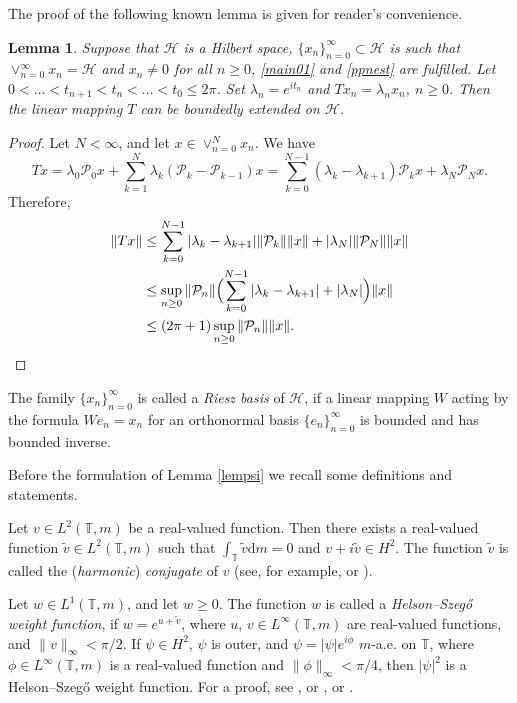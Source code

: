 \documentclass[a4paper,oneside,11pt]{amsart}
\numberwithin{equation}{section}
\theoremstyle{plain}
\newtheorem{lemma}[theorem]{Lemma}
\theoremstyle{definition}
\begin{document}
The proof of the following known lemma is given for reader's convenience. 

\begin{lemma} \label{lemttbounded} Suppose that $\mathcal H$ is a Hilbert space,  
$\{x_n\}_{n=0}^\infty\subset\mathcal H$ is such that $\vee_{n=0}^\infty x_n=\mathcal H$ and
 $x_n\neq 0$ for all $n\geq 0$, \eqref{main01} and   \eqref{ppnest} are fulfilled.  
Let $0<\ldots <t_{n+1}<t_n<\ldots<t_0\leq 2\pi$. Set $\lambda_n=e^{it_n}$ and $Tx_n=\lambda_n x_n$, $n\geq 0$. 
Then the linear mapping $T$ can be boundedly extended on $\mathcal H$. 
\end{lemma} 
\begin{proof}  Let $N<\infty$, and let $x\in\vee_{n=0}^N x_n$. 
We have  
$$Tx=\lambda_0\mathcal P_0 x + \sum_{k=1}^N \lambda_k(\mathcal P_k-\mathcal P_{k-1})x=
 \sum_{k=0}^{N-1}( \lambda_k-\lambda_{k+1})\mathcal P_k x +\lambda_N\mathcal P_N x.$$
Therefore, \begin{align*}\|Tx\|&\leq \sum_{k=0}^{N-1}|\lambda_k-\lambda_{k+1}|\|\mathcal P_k\|\| x \|+|\lambda_N|\|\mathcal P_N\|\| x\|\\&
\leq\sup_{n\geq 0}\|\mathcal P_n\|\Bigl(\sum_{k=0}^{N-1}|\lambda_k-\lambda_{k+1}|+|\lambda_N|\Bigr)\| x\|\\&\leq
(2\pi+1)\sup_{n\geq 0}\|\mathcal P_n\|\| x\|. \qedhere\end{align*}
\end{proof}

The family  $\{x_n\}_{n=0}^\infty$ is called a \emph{Riesz basis} of $\mathcal H$, if a linear mapping $W$ acting by the formula $We_n=x_n$ for an orthonormal basis $\{e_n\}_{n=0}^\infty$ is  bounded and has bounded inverse. 

Before the formulation of Lemma \ref{lempsi} we recall some definitions and statements. 

Let $v\in L^2(\mathbb T, m)$ be a real-valued function. Then there exists a real-valued function $\widetilde v\in L^2(\mathbb T, m)$ 
such that $\int_{\mathbb T}\widetilde v\mathrm{d}m=0$ and $v+i\widetilde v\in H^2$. The function $\widetilde v$ is called 
the (\emph{harmonic}) \emph{conjugate} of $v$ (see, for example, {\cite[Definition I.A.5.3.2]{nik02}} or {\cite[Sec. 2.1]{borsp}}). 

Let $w\in L^1(\mathbb T, m)$, and let $w\geq 0$. The function $w$ is called a \emph{Helson--Szeg\H o weight function}, if $w=e^{u+\widetilde v}$, where
 $u$, $v\in L^\infty(\mathbb T, m)$ are real-valued functions, and $\|v\|_\infty<\pi/2$. If $\psi\in H^2$, $\psi$ is outer, and  
$\psi=|\psi|e^{i\phi}$ $m$-a.e. on $\mathbb T$, where $\phi\in L^\infty(\mathbb T, m)$ is a real-valued function  and $\|\phi\|_\infty<\pi/4$, 
then $|\psi|^2$ is a Helson--Szeg\H o weight function. For a proof, see {\cite[Theorem 2.3(i)]{borsp}}, 
or {\cite[Theorems I.A.5.4.1 and I.B.4.3.1, Lemma I.B.4.3.3, Corollary I.B.4.2.6(2)]{nik02}}, 
or {\cite[Ch. VIII.6 and Appendix 4, Theorem 36, Corollaries 31 and 38]{nik86}}. 
\end{document}
